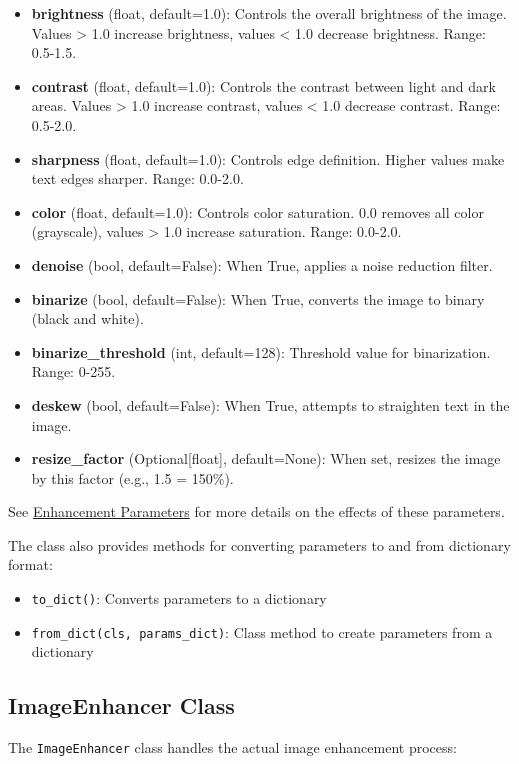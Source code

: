 \begin{itemize}
    \item \textbf{brightness} (float, default=1.0): Controls the overall brightness of the image. Values > 1.0 increase brightness, values < 1.0 decrease brightness. Range: 0.5-1.5.
    \item \textbf{contrast} (float, default=1.0): Controls the contrast between light and dark areas. Values > 1.0 increase contrast, values < 1.0 decrease contrast. Range: 0.5-2.0.
    \item \textbf{sharpness} (float, default=1.0): Controls edge definition. Higher values make text edges sharper. Range: 0.0-2.0.
    \item \textbf{color} (float, default=1.0): Controls color saturation. 0.0 removes all color (grayscale), values > 1.0 increase saturation. Range: 0.0-2.0.
    \item \textbf{denoise} (bool, default=False): When True, applies a noise reduction filter.
    \item \textbf{binarize} (bool, default=False): When True, converts the image to binary (black and white).
    \item \textbf{binarize\_threshold} (int, default=128): Threshold value for binarization. Range: 0-255.
    \item \textbf{deskew} (bool, default=False): When True, attempts to straighten text in the image.
    \item \textbf{resize\_factor} (Optional[float], default=None): When set, resizes the image by this factor (e.g., 1.5 = 150\%).
\end{itemize}

See \hyperref[sec:parameters]{Enhancement Parameters} for more details on the effects of these parameters.

The class also provides methods for converting parameters to and from dictionary format:
\begin{itemize}
    \item \texttt{to\_dict()}: Converts parameters to a dictionary
    \item \texttt{from\_dict(cls, params\_dict)}: Class method to create parameters from a dictionary
\end{itemize}

\subsection{ImageEnhancer Class}
The \texttt{ImageEnhancer} class handles the actual image enhancement process:

